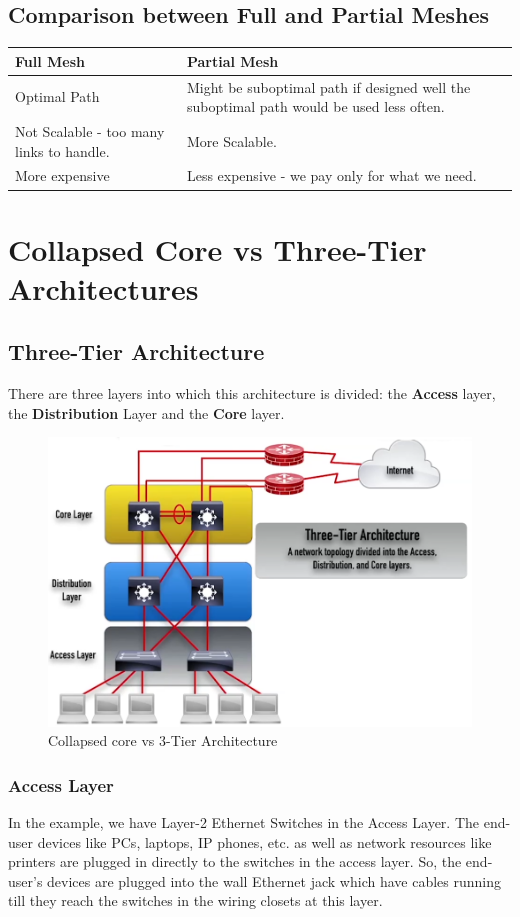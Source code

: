 \subsection{Comparison between Full and Partial Meshes}
\begin{tabular}{M{0.47}M{0.47}}
	\toprule
	\textbf{Full Mesh} &\textbf{Partial Mesh} \\
	\midrule
	Optimal Path	&Might be suboptimal path \- if designed well the suboptimal path would be used less often.\\
	\midrule
	Not Scalable - too many links to handle.	&More Scalable. \\
	\midrule
	More expensive &Less expensive - we pay only for what we need. \\
	\bottomrule
\end{tabular}

\section{Collapsed Core vs Three-Tier Architectures}
\subsection{Three-Tier Architecture}
There are three layers into which this architecture is divided: the \textbf{Access} layer, the \textbf{Distribution} Layer and the \textbf{Core} layer. 
\begin{figure}[H]
	\centering
	\includegraphics[width=0.85\linewidth]{"Mod1/chapters/1.3.d 3TierArch"}
	\caption{Collapsed core vs 3-Tier Architecture}
	\label{fig:collapsed_core_vs_3_tier}
\end{figure}
\vspace{-25pt}
\subsubsection{Access Layer}
\vspace{-10pt}
In the example, we have Layer-2 Ethernet Switches in the Access Layer. The end-user devices like PCs, laptops, IP phones, etc. as well as network resources like printers are plugged in directly to the switches in the access layer. So, the end-user's devices are plugged into the wall Ethernet jack which have cables running till they reach the switches in the wiring closets at this layer. 

